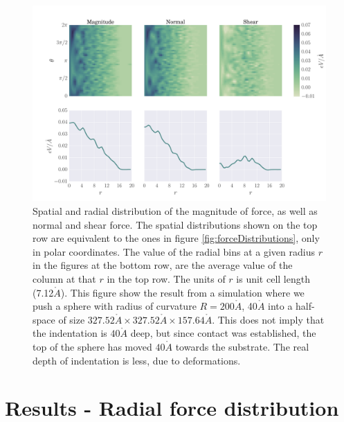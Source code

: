 \documentclass[twoside,english]{uiofysmaster}
\begin{document}
\vspace{5mm}
\begin{figure}[H]
	\centering
	\includegraphics[width=\linewidth, trim={12mm 8mm 1mm 15mm}, clip]{figures/forceDistribution/forces/normalForceDistribution110000}
	\vspace{0mm}
	\caption{Spatial and radial distribution of the magnitude of force, as well as normal and shear force. 
		The spatial distributions shown on the top row are equivalent to the ones in figure \ref{fig:forceDistributions}, only in polar coordinates. 
		The value of the radial bins at a given radius $r$ in the figures at the bottom row, are the average value of the column at that $r$ in the top row.
		The units of $r$ is unit cell length (7.12$\mathring{A}$).
		This figure show the result from a simulation where we push a sphere with radius of curvature $R=200\mathring{A}$,  40$\mathring{A}$ into a half-space of size $327.52\mathring{A} \times 327.52\mathring{A} \times 157.64 \mathring{A}$. 
		This does not imply that the indentation is $40\mathring{A}$ deep, but since contact was established, the top of the sphere has moved $40\mathring{A}$ towards the substrate. The real depth of indentation is less, due to deformations.}
	\label{fig:radialdistribution110000}
\end{figure}



\section{Results - Radial force distribution} \label{sec:resultsRadialForceDistribution}
\end{document}

